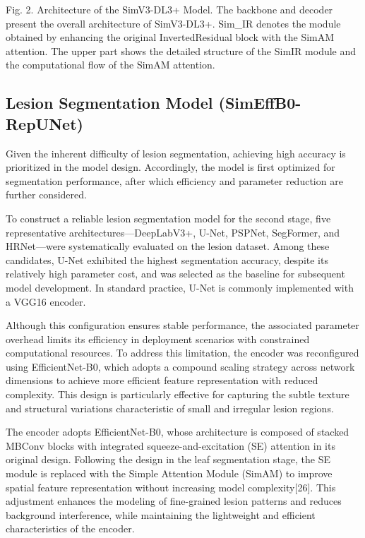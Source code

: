 \documentclass[
]{article}
\begin{document}
Fig. 2. Architecture of the SimV3-DL3+ Model. The backbone and decoder
present the overall architecture of SimV3-DL3+. Sim\_IR denotes the
module obtained by enhancing the original InvertedResidual block with
the SimAM attention. The upper part shows the detailed structure of the
SimIR module and the computational flow of the SimAM attention.

\hypertarget{lesion-segmentation-model-simeffb0-repunet}{%
\subsection{\texorpdfstring{Lesion Segmentation Model (SimEffB0-RepUNet)
}{Lesion Segmentation Model (SimEffB0-RepUNet) }}\label{lesion-segmentation-model-simeffb0-repunet}}

Given the inherent difficulty of lesion segmentation, achieving high
accuracy is prioritized in the model design. Accordingly, the model is
first optimized for segmentation performance, after which efficiency and
parameter reduction are further considered.

To construct a reliable lesion segmentation model for the second stage,
five representative architectures---DeepLabV3+, U-Net, PSPNet,
SegFormer, and HRNet---were systematically evaluated on the lesion
dataset. Among these candidates, U-Net exhibited the highest
segmentation accuracy, despite its relatively high parameter cost, and
was selected as the baseline for subsequent model development. In
standard practice, U-Net is commonly implemented with a VGG16 encoder.

Although this configuration ensures stable performance, the associated
parameter overhead limits its efficiency in deployment scenarios with
constrained computational resources. To address this limitation, the
encoder was reconfigured using EfficientNet-B0, which adopts a compound
scaling strategy across network dimensions to achieve more efficient
feature representation with reduced complexity. This design is
particularly effective for capturing the subtle texture and structural
variations characteristic of small and irregular lesion regions.

The encoder adopts EfficientNet-B0, whose architecture is composed of
stacked MBConv blocks with integrated squeeze-and-excitation (SE)
attention in its original design. Following the design in the leaf
segmentation stage, the SE module is replaced with the Simple Attention
Module (SimAM) to improve spatial feature representation without
increasing model complexity{[}26{]}. This adjustment enhances the
modeling of fine-grained lesion patterns and reduces background
interference, while maintaining the lightweight and efficient
characteristics of the encoder.
\end{document}
